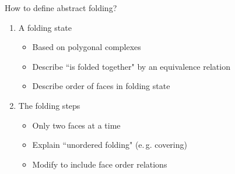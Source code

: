 \begin{frame}{How to define abstract folding?}
    \begin{enumerate}
        \item<3-> A folding state
            \begin{itemize}
                \item<5-> Based on polygonal complexes
                \item<6-> Describe ``is folded together" by an equivalence relation
                \item<7-> Describe order of faces in folding state
            \end{itemize}
        \item<4-> The folding steps
            \begin{itemize}
                \item<8-> Only two faces at a time
                \item<9-> Explain ``unordered folding" (e.\,g. covering)
                \item<10-> Modify to include face order relations
            \end{itemize}
    \end{enumerate}
\end{frame}



